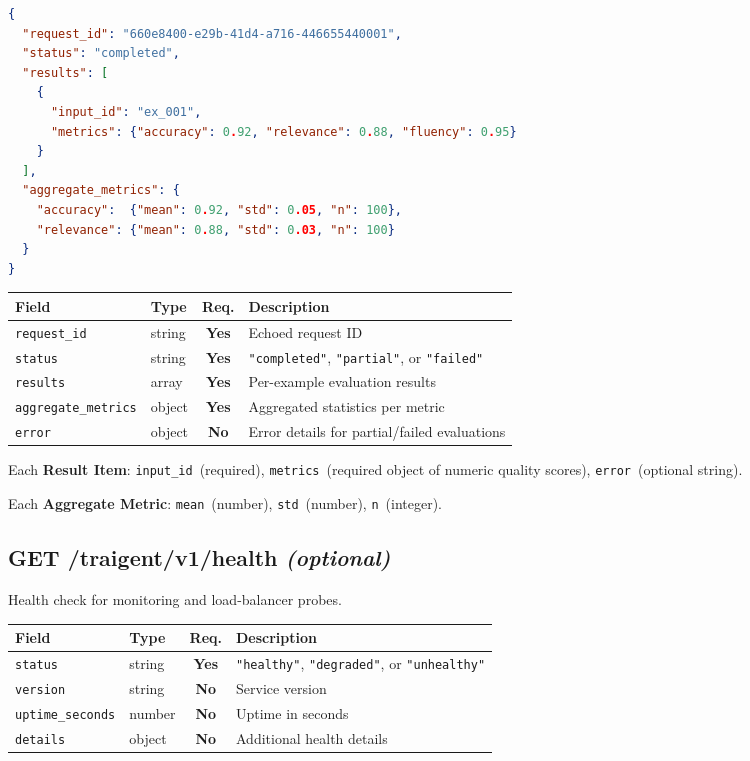 \documentclass[11pt,a4paper]{article}
\newcommand{\field}[1]{\texttt{#1}}
\newcommand{\required}{\textbf{Yes}}
\newcommand{\optional}{\textbf{No}}
\newcommand{\status}[1]{\texttt{"#1"}}
\begin{document}
\begin{lstlisting}[language=json]
{
  "request_id": "660e8400-e29b-41d4-a716-446655440001",
  "status": "completed",
  "results": [
    {
      "input_id": "ex_001",
      "metrics": {"accuracy": 0.92, "relevance": 0.88, "fluency": 0.95}
    }
  ],
  "aggregate_metrics": {
    "accuracy":  {"mean": 0.92, "std": 0.05, "n": 100},
    "relevance": {"mean": 0.88, "std": 0.03, "n": 100}
  }
}
\end{lstlisting}

\begin{center}\small
\begin{tabularx}{\textwidth}{@{}llcX@{}}
\toprule
\textbf{Field} & \textbf{Type} & \textbf{Req.} & \textbf{Description} \\
\midrule
\field{request\_id}        & string & \required & Echoed request ID \\
\field{status}             & string & \required & \status{completed}, \status{partial}, or \status{failed} \\
\field{results}            & array  & \required & Per-example evaluation results \\
\field{aggregate\_metrics} & object & \required & Aggregated statistics per metric \\
\field{error}              & object & \optional & Error details for partial/failed evaluations \\
\bottomrule
\end{tabularx}
\end{center}

Each \textbf{Result Item}: \field{input\_id}~(required), \field{metrics}~(required object of numeric quality scores), \field{error}~(optional string).

Each \textbf{Aggregate Metric}: \field{mean}~(number), \field{std}~(number), \field{n}~(integer).

\subsection{GET /traigent/v1/health \normalfont\textit{(optional)}}

Health check for monitoring and load-balancer probes.

\begin{center}\small
\begin{tabularx}{\textwidth}{@{}llcX@{}}
\toprule
\textbf{Field} & \textbf{Type} & \textbf{Req.} & \textbf{Description} \\
\midrule
\field{status}          & string & \required & \status{healthy}, \status{degraded}, or \status{unhealthy} \\
\field{version}         & string & \optional & Service version \\
\field{uptime\_seconds} & number & \optional & Uptime in seconds \\
\field{details}         & object & \optional & Additional health details \\
\bottomrule
\end{tabularx}
\end{center}
\end{document}
